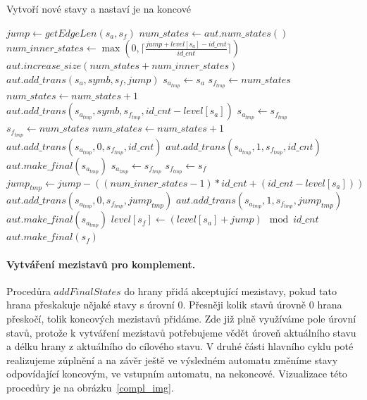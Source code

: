 \begin{algorithm}[t]
    \caption{Vytvoří nové stavy a nastaví je na koncové}
    \label{add_final_states}
        \begin{algorithmic}[1]
                \State $jump \gets getEdgeLen(s_a,s_f)$
                \State $num\_states \gets aut.num\_states()$
                \State $num\_inner\_states \gets \max (0,\lceil \frac{jump + level[s_a] - id\_cnt}{id\_cnt} \rceil)$
                \State $aut.increase\_size(num\_states + num\_inner\_states)$
                    \State $aut.add\_trans(s_a,symb,s_f,jump)$
                \Else
                    \State $s_{a_{tmp}} \gets s_a$
                    \State $s_{f_{tmp}} \gets num\_states$
                    \State $num\_states \gets num\_states + 1$
                    \State $aut.add\_trans(s_{a_{tmp}},symb,s_{f_{tmp}},id\_cnt-level[s_a])$
                        \State $s_{a_{tmp}} \gets s_{f_{tmp}}$
                        \State $s_{f_{tmp}} \gets num\_states$
                        \State $num\_states \gets num\_states + 1$
                        \State $aut.add\_trans(s_{a_{tmp}}, 0, s_{f_{tmp}}, id\_cnt)$
                        \State $aut.add\_trans(s_{a_{tmp}}, 1, s_{f_{tmp}}, id\_cnt)$
                        \State $aut.make\_final(s_{a_{tmp}})$
                    \EndFor
                    \State $s_{a_{tmp}} \gets s_{f_{tmp}}$
                    \State $s_{f_{tmp}} \gets s_f$
                    \State $jump_{tmp} \gets jump - ((num\_inner\_states - 1) * id\_cnt + (id\_cnt - level[s_a]))$
                    \State $aut.add\_trans(s_{a_{tmp}}, 0, s_{f_{tmp}}, jump_{tmp})$
                    \State $aut.add\_trans(s_{a_{tmp}}, 1, s_{f_{tmp}}, jump_{tmp})$
                    \State $aut.make\_final(s_{a_{tmp}})$
                \EndIf
                \State $level[s_f] \gets (level[s_a] + jump) \mod id\_cnt$
                    \State $aut.make\_final(s_f)$
                \EndIf
            \EndProcedure
        \end{algorithmic}
\end{algorithm}

\paragraph{Vytváření mezistavů pro komplement.} Procedůra $addFinalStates$ do hrany přidá akceptující mezistavy, pokud tato hrana přeskakuje nějaké stavy s úrovní $0$. Přesněji kolik stavů úrovně $0$ hrana přeskočí, tolik koncových mezistavů přidáme. Zde již plně využíváme pole úrovní stavů, protože k vytváření mezistavů potřebujeme vědět úroveň aktuálního stavu a délku hrany z aktuálního do cílového stavu. V druhé části hlavního cyklu poté realizujeme zúplnění a na závěr ještě ve výsledném automatu změníme stavy odpovídající koncovým, ve vstupním automatu, na nekoncové. Vizualizace této procedůry je na obrázku~\ref{compl_img}.

